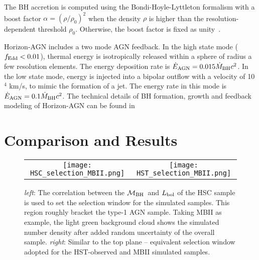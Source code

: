 \documentclass[twocolumn]{aastex631}
\def\mbh{$\mathcal M_{\rm BH}$}
\begin{document}
The BH accretion is computed using the Bondi-Hoyle-Lyttleton formalism with a boost factor $\alpha = (\rho/\rho_0)^2$ when the density $\rho$ is higher than the resolution-dependent threshold $\rho_0$. Otherwise, the boost factor is fixed as unity~\citep{2009MNRAS.398...53B}.

Horizon-AGN includes a two mode AGN feedback. In the high state mode ($f_{\rm Edd}<0.01$), thermal energy is isotropically released within a sphere of radius a few resolution elements. The energy deposition rate is $\dot{E}_{\rm AGN} = 0.015 \dot{M}_{\rm BH} c^2$. In the low state mode, energy is injected into a bipolar  outflow  with  a  velocity  of  10$^4$ km/s,  to  mimic the  formation  of  a  jet.  The  energy  rate  in  this  mode is $\dot{E}_{\rm AGN} = 0.1 \dot{M}_{\rm BH} c^2$.  The  technical  details  of  BH  formation,  growth  and  feedback  modeling  of  Horizon-AGN  can be found in~\citet{2012MNRAS.420.2662D} 



\section{Comparison and Results} \label{sec:result}
\begin{figure*}
\centering
\begin{tabular}{c c}
{\texttt{[image: HSC\_selection\_MBII.png]}} &
{\texttt{[image: HST\_selection\_MBII.png]}}
\end{tabular}
\caption{\label{fig:selection} 
{\it left}: The correlation between the \mbh\ and $L_{\rm bol}$ of the HSC sample is used to set the selection window for the simulated samples. This region roughly bracket the type-1 AGN sample. Taking MBII as example, the light green background cloud shows the simulated number density after added random uncertainty of the overall sample. 
{\it right}: Similar to the top plane -- equivalent selection window adopted for the HST-observed and MBII simulated samples.
}
\end{figure*} 
\end{document}
